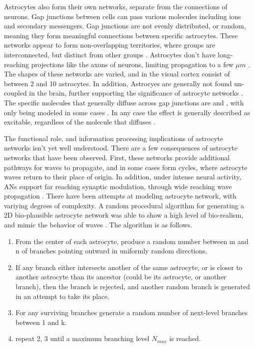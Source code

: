     Astrocytes also form their own networks, separate from the connections of
    neurons. Gap junctions between cells can pass various molecules including
    ions and secondary messengers. Gap junctions are not evenly distributed, or
    random, meaning they form meaningful connections between specific
    astrocytes. These networks appear to form non-overlapping territories, where
    groups are interconnected, but distinct from other
    groups \parencite{mederos_2018}. Astrocytes don't have long-reaching
    projections like the axons of neurons, limiting \ca propagation to a few
    $\mu m$ \parencite{hofer_2002}. The shapes of these networks are varied,
    and in the visual cortex consist of between 2 and 10 astrocytes. In
    addition, Astrocyes are generally not found un-coupled in the brain, further
    supporting the significance of astrocyte networks \parencite{postnov_2009}. The
    specific molecules that generally diffuse across gap junctions are \ipt and
    \ca, with only \ipt being modeled in some cases \parencite{pitta_2012}. In any
    case the effect is generally described as excitable, regardless of the
    molecule that diffuses \parencite{gordleeva_2021, pitta_2012, postnov_2009}.

    The functional role, and information processing implications of astrocyte
    networks isn't yet well understood. There are a few consequences of
    astrocyte networks that have been observed. First, these networks provide
    additional pathways for \ca waves to propagate, and in some cases form
    cycles, where astrocyte waves return to their place of origin. In addition,
    under intense neural activity, ANs support far reaching synaptic modulation,
    through wide reaching \ca wave propagation \parencite{postnov_2009}. There
    have been attempts at modeling astrocyte network, with variying degrees of
    complexity. A random procedural algorithm for generating a 2D bio-plausible
    astrocyte network was able to show a high level of bio-realism, and mimic
    the behavior of \ca waves \parencite{postnov_2009}. The algorithm is as
    follows.

    \begin{enumerate}
        \item From the center of each astrocyte, produce a random number between
          m and n of branches pointing outward in uniformly random directions.
        \item If any branch either intersects another of the same astrocyte, or
          is closer to another astrocyte than its ancestor (could be its
          astrocyte, or another branch), then the branch is rejected, and
          another random branch is generated in an attempt to take its place.
        \item For any surviving branches generate a random number of next-level
          branches between 1 and k.
        \item repeat 2, 3 until a maximum branching level $N_{max}$ is reached.
    \end{enumerate}

